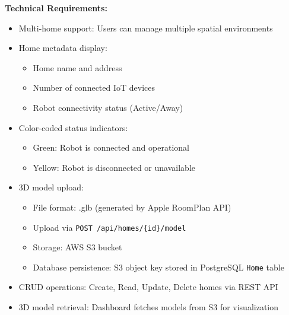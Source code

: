 \documentclass[conference]{IEEEtran}
\begin{document}
\begin{enumerate}
\textbf{Technical Requirements:}
\begin{itemize}
    \item Multi-home support: Users can manage multiple spatial environments
    \item Home metadata display:
    \begin{itemize}
        \item Home name and address
        \item Number of connected IoT devices
        \item Robot connectivity status (Active/Away)
    \end{itemize}
    \item Color-coded status indicators:
    \begin{itemize}
        \item Green: Robot is connected and operational
        \item Yellow: Robot is disconnected or unavailable
    \end{itemize}
    \item 3D model upload:
    \begin{itemize}
        \item File format: .glb (generated by Apple RoomPlan API)
        \item Upload via \texttt{POST /api/homes/\{id\}/model}
        \item Storage: AWS S3 bucket
        \item Database persistence: S3 object key stored in PostgreSQL \texttt{Home} table
    \end{itemize}
    \item CRUD operations: Create, Read, Update, Delete homes via REST API
    \item 3D model retrieval: Dashboard fetches models from S3 for visualization
\end{itemize}

\end{enumerate}
\end{document}
